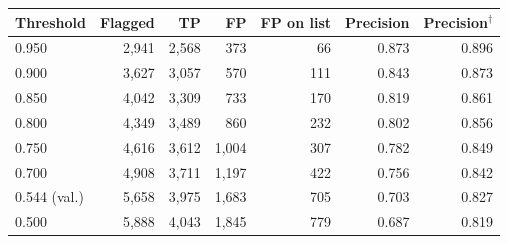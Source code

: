 \begin{tabular}{lrrrrrr}
\toprule
Threshold & Flagged & TP & FP & FP on list & Precision & Precision$^\dagger$ \\
\midrule
0.950 & 2,941 & 2,568 & 373 & 66 & 0.873 & 0.896 \\
0.900 & 3,627 & 3,057 & 570 & 111 & 0.843 & 0.873 \\
0.850 & 4,042 & 3,309 & 733 & 170 & 0.819 & 0.861 \\
0.800 & 4,349 & 3,489 & 860 & 232 & 0.802 & 0.856 \\
0.750 & 4,616 & 3,612 & 1,004 & 307 & 0.782 & 0.849 \\
0.700 & 4,908 & 3,711 & 1,197 & 422 & 0.756 & 0.842 \\
0.544 (val.) & 5,658 & 3,975 & 1,683 & 705 & 0.703 & 0.827 \\
0.500 & 5,888 & 4,043 & 1,845 & 779 & 0.687 & 0.819 \\
\bottomrule
\end{tabular}
